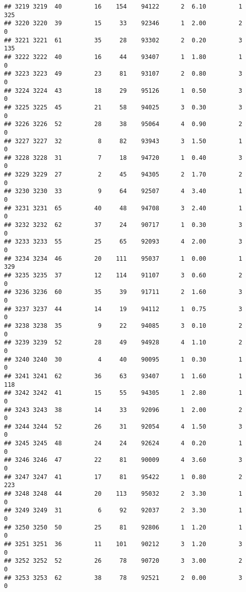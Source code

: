\documentclass[
]{article}
\begin{document}
\begin{verbatim}
## 3219 3219  40         16    154    94122      2  6.10         1      325
## 3220 3220  39         15     33    92346      1  2.00         2        0
## 3221 3221  61         35     28    93302      2  0.20         3      135
## 3222 3222  40         16     44    93407      1  1.80         1        0
## 3223 3223  49         23     81    93107      2  0.80         3        0
## 3224 3224  43         18     29    95126      1  0.50         3        0
## 3225 3225  45         21     58    94025      3  0.30         3        0
## 3226 3226  52         28     38    95064      4  0.90         2        0
## 3227 3227  32          8     82    93943      3  1.50         1        0
## 3228 3228  31          7     18    94720      1  0.40         3        0
## 3229 3229  27          2     45    94305      2  1.70         2        0
## 3230 3230  33          9     64    92507      4  3.40         1        0
## 3231 3231  65         40     48    94708      3  2.40         1        0
## 3232 3232  62         37     24    90717      1  0.30         3        0
## 3233 3233  55         25     65    92093      4  2.00         3        0
## 3234 3234  46         20    111    95037      1  0.00         1      329
## 3235 3235  37         12    114    91107      3  0.60         2        0
## 3236 3236  60         35     39    91711      2  1.60         3        0
## 3237 3237  44         14     19    94112      1  0.75         3        0
## 3238 3238  35          9     22    94085      3  0.10         2        0
## 3239 3239  52         28     49    94928      4  1.10         2        0
## 3240 3240  30          4     40    90095      1  0.30         1        0
## 3241 3241  62         36     63    93407      1  1.60         1      118
## 3242 3242  41         15     55    94305      1  2.80         1        0
## 3243 3243  38         14     33    92096      1  2.00         2        0
## 3244 3244  52         26     31    92054      4  1.50         3        0
## 3245 3245  48         24     24    92624      4  0.20         1        0
## 3246 3246  47         22     81    90009      4  3.60         3        0
## 3247 3247  41         17     81    95422      1  0.80         2      223
## 3248 3248  44         20    113    95032      2  3.30         1        0
## 3249 3249  31          6     92    92037      2  3.30         1        0
## 3250 3250  50         25     81    92806      1  1.20         1        0
## 3251 3251  36         11    101    90212      3  1.20         3        0
## 3252 3252  52         26     78    90720      3  3.00         2        0
## 3253 3253  62         38     78    92521      2  0.00         3        0

\end{verbatim}
\end{document}
